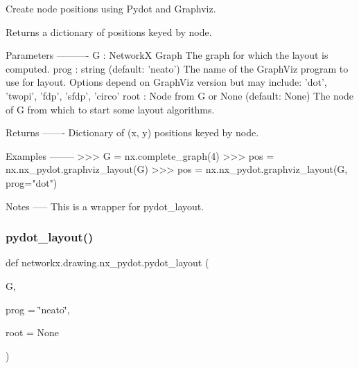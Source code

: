 \begin{DoxyVerb}Create node positions using Pydot and Graphviz.

Returns a dictionary of positions keyed by node.

Parameters
----------
G : NetworkX Graph
    The graph for which the layout is computed.
prog : string (default: 'neato')
    The name of the GraphViz program to use for layout.
    Options depend on GraphViz version but may include:
    'dot', 'twopi', 'fdp', 'sfdp', 'circo'
root : Node from G or None (default: None)
    The node of G from which to start some layout algorithms.

Returns
-------
  Dictionary of (x, y) positions keyed by node.

Examples
--------
>>> G = nx.complete_graph(4)
>>> pos = nx.nx_pydot.graphviz_layout(G)
>>> pos = nx.nx_pydot.graphviz_layout(G, prog="dot")

Notes
-----
This is a wrapper for pydot_layout.
\end{DoxyVerb}
 \mbox{\label{namespacenetworkx_1_1drawing_1_1nx__pydot_a3f26b8104d7ff44aefb4f8c47126c9e8}} 
\subsubsection{\texorpdfstring{pydot\+\_\+layout()}{pydot\_layout()}}
{\footnotesize\ttfamily def networkx.\+drawing.\+nx\+\_\+pydot.\+pydot\+\_\+layout (\begin{DoxyParamCaption}\item[{}]{G,  }\item[{}]{prog = {\ttfamily \char`\"{}neato\char`\"{}},  }\item[{}]{root = {\ttfamily None} }\end{DoxyParamCaption})}

